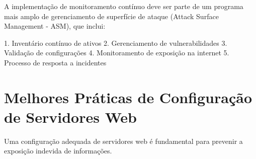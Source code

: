 \documentclass[12pt,a4paper]{book}
\begin{document}
\begin{notebox}
A implementação de monitoramento contínuo deve ser parte de um programa mais amplo de gerenciamento de superfície de ataque (Attack Surface Management - ASM), que inclui:

1. Inventário contínuo de ativos
2. Gerenciamento de vulnerabilidades
3. Validação de configurações
4. Monitoramento de exposição na internet
5. Processo de resposta a incidentes
\end{notebox}

\section{Melhores Práticas de Configuração de Servidores Web}

Uma configuração adequada de servidores web é fundamental para prevenir a exposição indevida de informações.
\end{document}
